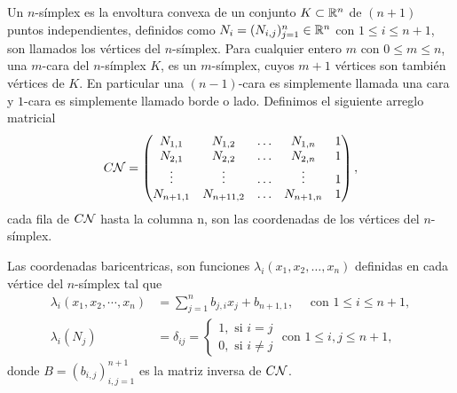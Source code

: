 \begin{definicion}
Un $n$-s\'implex es la envoltura convexa de un conjunto $K\subset {\ensuremath{\mathbb{R}}}^{n}$ de $(n + 1)$ puntos independientes, definidos como $N_{i}=(N_{i,j})_{j=1}^{n} \in {\ensuremath{\mathbb{R}}}^{n}$ con $1\leq i\leq n+1$, son llamados los v\'ertices del $n$-s\'implex. Para cualquier entero $m$ con $ 0\leq m \leq n$, una $m$-cara del $n$-s\'implex $K$,  es un $m$-s\'implex, cuyos $m + 1$ v\'ertices son tambi\'en v\'ertices de $K$. En particular una $(n-1)$-cara es simplemente llamada una cara y $1$-cara es simplemente llamado borde o lado.  Definimos el siguiente arreglo matricial 
\begin{equation}
C{\mathcal{N}}=\begin{pmatrix}
N_{1,1}& N_{1,2} & \ldots & N_{1,n} & 1 \\
N_{2,1}& N_{2,2} & \ldots & N_{2,n} & 1 \\
\vdots &  \vdots & \ldots & \vdots  & 1 \\
N_{n+1,1}& N_{n+11,2} & \ldots & N_{n+1,n} & 1 \\
\end{pmatrix},
\end{equation}
cada fila de $C{\mathcal{N}}$ hasta la columna n, son las coordenadas de los v\'ertices del $n$-s\'implex.

Las coordenadas baricentricas, son funciones $\lambda_{i}(x_{1},x_{2},\ldots,x_{n})$ definidas en cada v\'ertice del $n$-s\'implex tal que 
\begin{equation}
\begin{split}
\lambda_{i}(x_{1},x_{2},\cdots,x_{n})&=\sum_{j=1}^{n} b_{j,i}x_{j} + b_{n+1,1}, \quad \text{ con } 1\leq i\leq n+1,\\
\lambda_{i}(N_{j})&= \delta_{ij}=\begin{cases}
1, \text{ si }i=j\\
0, \text{ si }i\neq j
\end{cases} \text{ con } 1\leq i,j\leq n+1,
\end{split}
\end{equation}
donde $B=(b_{i,j})_{i,j=1}^{n+1}$ es la matriz inversa de $C{\mathcal{N}}$.
\end{definicion}

